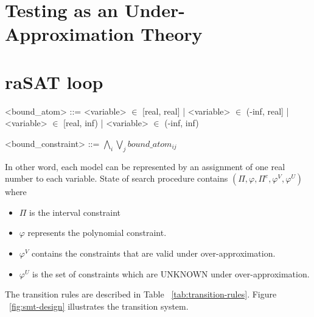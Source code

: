 \section{Testing as an Under-Approximation Theory}


\section{raSAT loop}
\begin{grammar}
<bound\_atom> ::= <variable> $\in$ [real, real] | <variable> $\in$ (-inf, real] | <variable> $\in$ [real, inf) | <variable> $\in$ (-inf, inf)


<bound\_constraint> ::= $\bigwedge\limits_i\bigvee\limits_jbound\_atom_{ij}$
\end{grammar}
In other word, each model can be represented by an assignment of one real number to each variable. 
State of search procedure contains  $(\Pi, \varphi, \Pi^c, \varphi^V, \varphi^U)$ where 
\begin{itemize}
\item $\Pi$ is the interval constraint
\item $\varphi$ represents the polynomial constraint.
\item $\varphi^V$ contains the constraints that are valid under over-approximation.
\item $\varphi^U$ is the set of constraints which are UNKNOWN under over-approximation.
\end{itemize}
The transition rules are described in Table ~\ref{tab:transition-rules}. Figure ~\ref{fig:smt-design} illustrates the transition system. 

